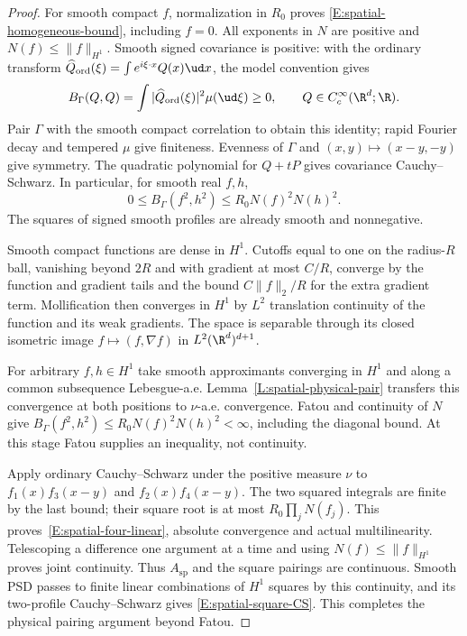\begin{proof}
  For smooth compact $f$, normalization in $R_0$ proves
  \eqref{E:spatial-homogeneous-bound}, including $f=0$.
  All exponents in $N$ are positive and $N(f)\le\|f\|_{H^1}$.
  Smooth signed covariance is positive: with the ordinary transform
  $\widehat Q_{\mathrm{ord}}(\xi)=\int e^{i\xi\cdot x}Q(x)\ud x$,
  the model convention gives
  \[
    B_\Gamma(Q,Q)=\int|\widehat Q_{\mathrm{ord}}(\xi)|^2\mu(\ud\xi)
    \ge0,\qquad Q\in C_c^\infty(\R^d;\R).
  \]
  Pair $\Gamma$ with the smooth compact correlation to obtain this
  identity; rapid Fourier decay and tempered $\mu$ give finiteness.
  Evenness of $\Gamma$ and $(x,y)\mapsto(x-y,-y)$ give symmetry.
  The quadratic polynomial for $Q+tP$ gives covariance
  Cauchy--Schwarz. In particular, for smooth real $f,h$,
  \[
    0\le B_\Gamma(f^2,h^2)
    \le R_0N(f)^2N(h)^2.
  \]
  The squares of signed smooth profiles are already smooth and
  nonnegative.

  Smooth compact functions are dense in $H^1$. Cutoffs equal to one
  on the radius-$R$ ball, vanishing beyond $2R$ and with gradient
  at most $C/R$, converge by the function and gradient tails and
  the bound $C\|f\|_2/R$ for the extra gradient term.
  Mollification then converges in $H^1$ by $L^2$ translation
  continuity of the function and its weak gradients.
  The space is separable through its closed isometric image
  $f\mapsto(f,\nabla f)$ in $L^2(\R^d)^{d+1}$.

  For arbitrary $f,h\in H^1$ take smooth approximants converging in
  $H^1$ and along a common subsequence Lebesgue-a.e.
  Lemma~\ref{L:spatial-physical-pair} transfers this convergence at
  both positions to $\nu$-a.e. convergence.
  Fatou and continuity of $N$ give
  $B_\Gamma(f^2,h^2)\le R_0N(f)^2N(h)^2<\infty$,
  including the diagonal bound.
  At this stage Fatou supplies an inequality, not continuity.

  Apply ordinary Cauchy--Schwarz under the positive measure $\nu$
  to $f_1(x)f_3(x-y)$ and $f_2(x)f_4(x-y)$.
  The two squared integrals are finite by the last bound; their
  square root is at most $R_0\prod_jN(f_j)$.
  This proves~\eqref{E:spatial-four-linear}, absolute convergence
  and actual multilinearity. Telescoping a difference one argument
  at a time and using $N(f)\le\|f\|_{H^1}$ proves joint continuity.
  Thus $A_{\mathrm{sp}}$ and the square pairings are continuous.
  Smooth PSD passes to finite linear combinations of $H^1$ squares
  by this continuity, and its two-profile Cauchy--Schwarz gives
  \eqref{E:spatial-square-CS}.
  This completes the physical pairing argument beyond Fatou.


\end{proof}
